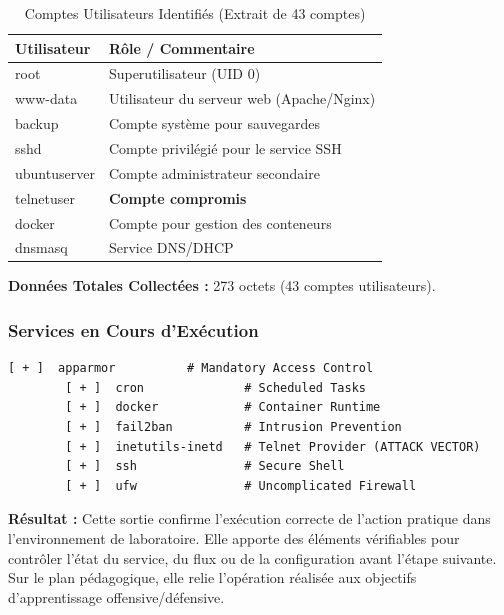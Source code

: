 \documentclass[12pt,a4paper,openany]{report}
\newcommand{\tableheadcolor}{\rowcolor{tableheadbg}}
\begin{document}
	\begin{table}[ht]
		\centering
		\small
		\renewcommand{\arraystretch}{1.3}
		\setlength{\arrayrulewidth}{0.5pt}
		\begin{tabular}{>{\ttfamily}p{3.5cm} p{8.5cm}}
			\arrayrulecolor{tableborder}
			\hline
			\tableheadcolor
			\textcolor{tableheadfg}{\textbf{Utilisateur}} &
			\textcolor{tableheadfg}{\textbf{Rôle / Commentaire}} \\
			\hline
			\rowcolor{tablerowalt}
			root & Superutilisateur (UID 0) \\
			www-data & Utilisateur du serveur web (Apache/Nginx) \\
			\rowcolor{tablerowalt}
			backup & Compte système pour sauvegardes \\
			sshd & Compte privilégié pour le service SSH \\
			\rowcolor{tablerowalt}
			ubuntuserver & Compte administrateur secondaire \\
			telnetuser & \textcolor{accent}{\textbf{Compte compromis}} \\
			\rowcolor{tablerowalt}
			docker & Compte pour gestion des conteneurs \\
			dnsmasq & Service DNS/DHCP \\
			\hline
		\end{tabular}
		\caption{Comptes Utilisateurs Identifiés (Extrait de 43 comptes)}
		\label{tab:user-accounts}
	\end{table}
	
	\textbf{Données Totales Collectées :} 273 octets (43 comptes utilisateurs).
	
	\subsubsection{Services en Cours d'Exécution}
	
	\begin{lstlisting}[style=logstyle,caption=Fichier de Loot : Services Actifs]
		[ + ]  apparmor          # Mandatory Access Control
		[ + ]  cron              # Scheduled Tasks
		[ + ]  docker            # Container Runtime
		[ + ]  fail2ban          # Intrusion Prevention
		[ + ]  inetutils-inetd   # Telnet Provider (ATTACK VECTOR)
		[ + ]  ssh               # Secure Shell
		[ + ]  ufw               # Uncomplicated Firewall
	\end{lstlisting}
	
	\textbf{Résultat :} Cette sortie confirme l'exécution correcte de l'action pratique dans l'environnement de laboratoire. Elle apporte des éléments vérifiables pour contrôler l'état du service, du flux ou de la configuration avant l'étape suivante. Sur le plan pédagogique, elle relie l'opération réalisée aux objectifs d'apprentissage offensive/défensive.
	
\end{document}
